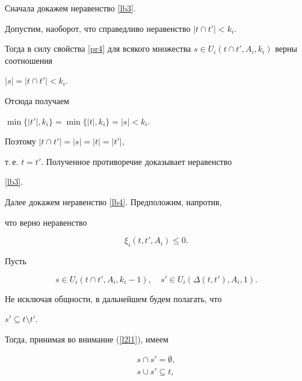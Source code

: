 \begin{pf}


Сначала докажем неравенство \eqref{lb3}.


Допустим, наоборот, что справедливо неравенство $|t\cap t'|< k_i$.


Тогда в силу свойства \ref{pr4} для всякого множества $s \in


U_i(t\cap t', A_i, k_i)$ верны соотношения


$|s|=|t \cap t'|<k_i$.


Отсюда получаем


$\min \{|t'|, k_i \}=\min \{|t|, k_i \}=|s|<k_i$.


Поэтому $|t \cap t'|=|s|=|t|=|t'|$,


т.\,е. $t=t'$. Полученное противоречие доказывает неравенство


\eqref{lb3}.





Далее докажем неравенство \eqref{lb4}. Предположим, напротив,


что верно неравенство


\begin{equation} \label{lb5}


 \xi_i(t, t', A_i)\leq 0.


\end{equation}


Пусть


\begin{equation}\label{l2l1}


 s\in U_i(t \cap t', A_i, k_i-1),\quad s' \in U_i(\Delta(t,


t'), A_i, 1).


\end{equation}





Не исключая общности, в дальнейшем будем полагать, что


$s'\subseteq t\setminus t'$.


Тогда, принимая во внимание (\ref{l2l1}), имеем


\begin{gather}\label{l2l2}


s\cap s'=\emptyset, \\


\label{l2l3}


 s \cup s' \subseteq t,\\


\label{l2l2l}



\end{gather}
\end{pf}
